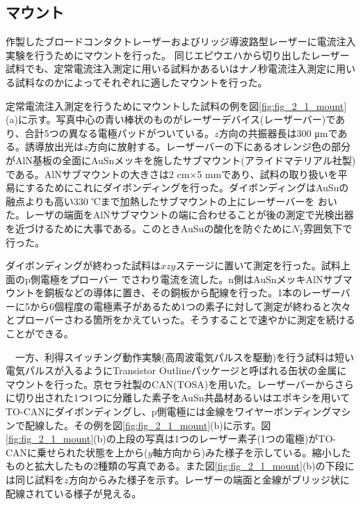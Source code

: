 \subsection{マウント}%
作製したブロードコンタクトレーザーおよびリッジ導波路型レーザーに電流注入実験を行うためにマウントを行った。
同じエピウエハから切り出したレーザー試料でも、定常電流注入測定に用いる試料かあるいはナノ秒電流注入測定に用いる試料なのかによってそれぞれに適したマウントを行った。


定常電流注入測定を行うためにマウントした試料の例を図\ref{fig:fig_2_1_mount}(a)に示す。写真中心の青い棒状のものがレーザーデバイス(レーザーバー)であり、合計5つの異なる電極パッドがついている。$z$方向の共振器長は300 \si{\micro\metre}である。誘導放出光は$z$方向に放射する。レーザーバーの下にあるオレンジ色の部分がAlN基板の全面にAuSnメッキを施したサブマウント(アライドマテリアル社製)である。AlNサブマウントの大きさは2 cm×5 mmであり、試料の取り扱いを平易にするためにこれにダイボンディングを行った。ダイボンディングはAuSuの融点よりも高い330 ℃まで加熱したサブマウントの上にレーザーバーを
おいた。レーザの端面をAlNサブマウントの端に合わせることが後の測定で光検出器を近づけるために大事である。このときAuSuの酸化を防ぐために$N_{2}$雰囲気下で行った。


ダイボンディングが終わった試料は$xzy$ステージに置いて測定を行った。試料上面のp側電極をプローバー
でさわり電流を流した。n側はAuSnメッキAlNサブマウントを銅板などの導体に置き、その銅板から配線を行った。1本のレーザーバーに5から6個程度の電極素子があるため1つの素子に対して測定が終わると次々とプローバーさわる箇所をかえていった。そうすることで速やかに測定を続けることができる。


　一方、利得スイッチング動作実験(高周波電気パルスを駆動)を行う試料は短い電気パルスが入るようにTransistor Outlineパッケージと呼ばれる缶状の金属にマウントを行った。京セラ社製のCAN(TOSA)を用いた。レーザーバーからさらに切り出された1つ1つに分離した素子をAuSn共晶材あるいはエポキシを用いてTO-CANにダイボンディングし、p側電極には金線をワイヤーボンディングマシンで配線した。その例を図\ref{fig:fig_2_1_mount}(b)に示す。図\ref{fig:fig_2_1_mount}(b)の上段の写真は1つのレーザー素子(1つの電極)がTO-CANに乗せられた状態を上から($y$軸方向から)みた様子を示している。縮小したものと拡大したもの2種類の写真である。また図\ref{fig:fig_2_1_mount}(b)の下段には同じ試料を$z$方向からみた様子を示す。レーザーの端面と金線がブリッジ状に配線されている様子が見える。

